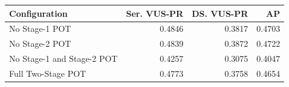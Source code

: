 \begin{tabular}{lrrr}
\toprule
Configuration & Ser. VUS-PR & DS. VUS-PR & AP \\
\midrule
No Stage-1 POT & 0.4846 & 0.3817 & 0.4703 \\
No Stage-2 POT & 0.4839 & 0.3872 & 0.4722 \\
No Stage-1 and Stage-2 POT & 0.4257 & 0.3075 & 0.4047 \\
Full Two-Stage POT & 0.4773 & 0.3758 & 0.4654 \\
\bottomrule
\end{tabular}
